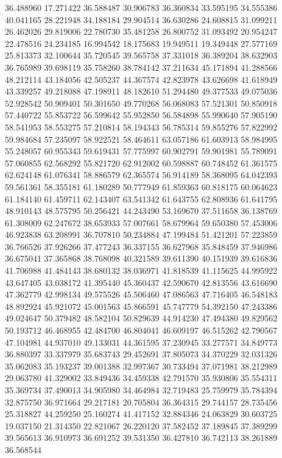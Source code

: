 36.488960
17.271422
36.588487
30.906783
36.360834
33.595195
34.555386
40.041165
28.221948
34.188184
29.904514
36.630286
24.608815
31.099211
26.462026
29.819006
22.780730
35.481258
26.800752
31.093492
20.954247
22.478516
24.234185
16.994542
18.175683
19.949511
19.349448
27.577169
25.813373
32.100644
35.720545
39.565758
37.331018
36.389204
38.632903
36.765989
39.698119
35.758260
38.784142
37.211634
45.171894
41.288566
48.212114
43.184056
42.505237
44.367574
42.823978
43.626698
41.618949
43.339257
49.218088
47.198911
48.182610
51.294480
49.377533
49.075036
52.928542
50.909401
50.301650
49.770268
56.068083
57.521301
50.850918
57.440722
55.853722
56.599642
55.952850
56.584898
55.990640
57.905190
58.541953
58.553275
57.210814
58.194343
56.785314
59.855276
57.822992
59.984684
57.235097
58.922521
58.464611
63.057186
61.603913
58.984995
55.248057
60.955343
59.619431
57.775997
60.902791
59.901981
55.789091
57.060855
62.568292
55.821720
62.912002
60.598887
60.748452
61.361575
62.624148
61.076341
58.886579
62.365574
56.914189
58.368095
64.042393
59.561361
58.355181
61.180289
50.777949
61.859363
60.818175
60.064623
61.184140
61.459711
62.143407
63.541342
61.643755
62.808936
61.641795
48.910143
48.575795
50.256421
44.243490
53.169670
37.511658
36.138769
61.308009
62.247672
38.653933
57.007661
58.679964
59.650380
57.453006
46.923838
63.208991
36.707810
50.234884
47.199484
51.421201
57.223859
36.766526
37.926266
37.477243
36.337155
36.627968
35.848459
37.946986
36.675041
37.365868
38.768098
40.321589
39.611390
40.151939
39.616836
41.706988
41.484143
38.680132
38.036971
41.818539
41.115625
44.995922
43.647405
43.038172
41.395440
45.360437
42.590670
42.813556
43.616690
47.362779
42.998134
49.575526
45.506460
47.086563
47.716405
46.548183
48.892924
45.921072
45.001563
45.866591
45.747779
54.392150
47.243386
49.024647
50.379482
48.582104
50.829639
44.914230
47.494380
49.829562
50.193712
46.468955
42.484700
46.804041
46.609197
46.515262
42.790567
47.104981
44.937010
49.133031
44.361595
37.230945
33.277571
34.849773
36.880397
33.337979
35.683743
29.452691
37.805073
34.370229
32.031326
35.062083
35.193237
39.001388
32.997367
30.733494
37.071981
38.212989
29.063780
41.329002
33.849436
34.459338
42.791570
35.930806
35.554311
35.369734
37.490013
34.905980
34.464984
32.719483
25.759979
35.784394
32.875750
36.971664
29.217181
20.705804
36.364315
29.744157
28.735456
25.318827
44.259250
25.160274
41.417152
32.884346
24.063829
30.603725
19.037150
21.314350
22.821067
26.220120
37.582452
37.189845
37.389299
39.565613
36.910973
36.691252
39.531350
36.427810
36.742113
38.261889
36.568544
